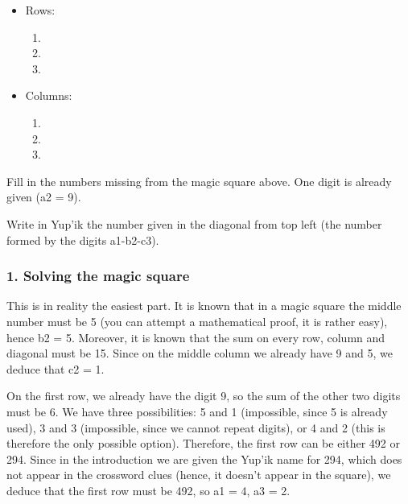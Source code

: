 \begin{refsection}
\begin{problem}{\langnameYupik}{\nameKLow}{}
\begin{itemize}
\item Rows:
    \begin{enumerate}[label = \alph*.,nosep]
     \item {}
     \item {}
     \item {}
     \end{enumerate}
\item Columns:
    \begin{enumerate}[nosep]
      \item {}
      \item {}
      \item {}
    \end{enumerate}
\end{itemize}


\begin{assgts}
\item Fill in the numbers missing from the magic square above. One digit is already given (a2 = 9).
\item Write in Yup'ik the number given in the diagonal from top left (the number formed by the digits a1-b2-c3).

\end{assgts}
\end{problem}

\begin{mysolution}

\subsubsection*{1. Solving the magic square}

This is in reality the easiest part. It is known that in a magic square the middle number must be 5 (you can attempt a mathematical proof, it is rather easy), hence b2 = 5. Moreover, it is known that the sum on every row, column and diagonal must be 15. Since on the middle column we already have 9 and 5, we deduce that c2 = 1.

On the first row, we already have the digit 9, so the sum of the other two digits must be 6. We have three possibilities: 5 and 1 (impossible, since 5 is already used), 3 and 3 (impossible, since we cannot repeat digits), or 4 and 2 (this is therefore the only possible option). Therefore, the first row can be either 492 or 294. Since in the introduction we are given the Yup'ik name for 294, which does not appear in the crossword clues (hence, it doesn't appear in the square), we deduce that the first row must be 492, so a1 = 4, a3 = 2.


\end{mysolution}
\end{refsection}
